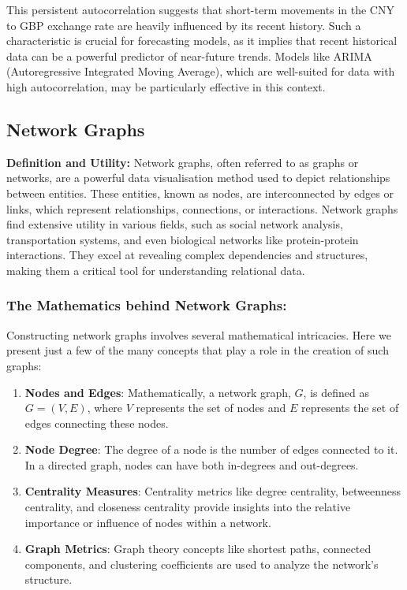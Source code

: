\documentclass{article}\usepackage[]{graphicx}\usepackage[]{xcolor}
\begin{document}
This persistent autocorrelation suggests that short-term movements in the CNY to GBP exchange rate are heavily influenced by its recent history. Such a characteristic is crucial for forecasting models, as it implies that recent historical data can be a powerful predictor of near-future trends. Models like ARIMA (Autoregressive Integrated Moving Average), which are well-suited for data with high autocorrelation, may be particularly effective in this context.


\subsection{Network Graphs}
\textbf{Definition and Utility:}
Network graphs, often referred to as graphs or networks, are a powerful data visualisation method used to depict relationships between entities. These entities, known as nodes, are interconnected by edges or links, which represent relationships, connections, or interactions. Network graphs find extensive utility in various fields, such as social network analysis, transportation systems, and even biological networks like protein-protein interactions. They excel at revealing complex dependencies and structures, making them a critical tool for understanding relational data.

\subsubsection{The Mathematics behind Network Graphs:}
Constructing network graphs involves several mathematical intricacies. Here we present just a few of the many concepts that play a role in the creation of such graphs:
\begin{enumerate}
\item \textbf{Nodes and Edges}: Mathematically, a network graph, \(G\), is defined as \(G = (V, E)\), where \(V\) represents the set of nodes and \(E\) represents the set of edges connecting these nodes.
\item \textbf{Node Degree}: The degree of a node is the number of edges connected to it. In a directed graph, nodes can have both in-degrees and out-degrees.
\item \textbf{Centrality Measures}: Centrality metrics like degree centrality, betweenness centrality, and closeness centrality provide insights into the relative importance or influence of nodes within a network.
\item \textbf{Graph Metrics}: Graph theory concepts like shortest paths, connected components, and clustering coefficients are used to analyze the network's structure.
\end{enumerate}
\end{document}
